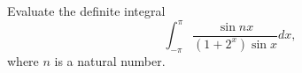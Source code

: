 Evaluate the definite integral
$$\int_{-\pi}^{\pi}\frac{\sin nx}{(1+2^{x})\sin x} dx,$$where $n$ is a natural number.